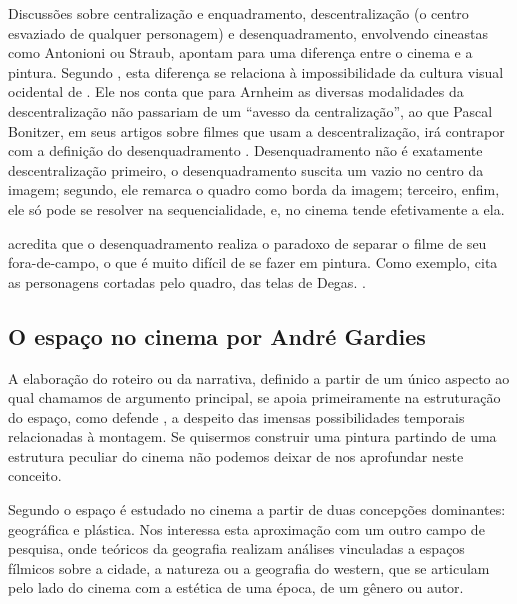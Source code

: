 Discussões sobre centralização e enquadramento, descentralização (o
centro esvaziado de qualquer personagem) e desenquadramento, envolvendo
cineastas como Antonioni ou Straub, apontam para uma diferença entre o
cinema e a pintura. Segundo \textcite{aumont2004olho}, esta diferença
se relaciona à impossibilidade da cultura visual ocidental de
. Ele nos conta que para Arnheim as
diversas modalidades da descentralização não passariam de um
\enquote{avesso da centralização}, ao que Pascal Bonitzer, em seus
artigos sobre filmes que usam a descentralização, irá contrapor com a
definição do desenquadramento \parencite[2019]{aumont2004olho}. Desenquadramento não é exatamente
descentralização \textelp{} primeiro, o desenquadramento suscita um
vazio no centro da imagem; segundo, ele remarca o quadro como borda da
imagem; terceiro, enfim, ele só pode se resolver na sequencialidade, e,
no cinema tende efetivamente a ela.
\parencite[Bonitzer \emph{in}][129]{aumont2004olho}

\citeauthor{aumont2004olho} acredita que o desenquadramento realiza o paradoxo de separar o filme de seu
fora-de-campo, o que é muito difícil de se fazer em pintura. Como
exemplo, cita as personagens cortadas pelo quadro, das telas de Degas.
.

\subsection{O espaço no cinema por André Gardies}%
\label{sec-espaco-cinema-gardies}

A elaboração do roteiro ou da narrativa, definido a partir de um único
aspecto ao qual chamamos de argumento principal, se apoia primeiramente
na estruturação do espaço, como defende \textcite{gardies2019espaco}, a
despeito das imensas possibilidades temporais relacionadas à montagem.
Se quisermos construir uma pintura partindo de uma estrutura peculiar
do cinema não podemos deixar de nos aprofundar neste conceito.

Segundo \textcite{gardies2019espaco} o espaço é estudado no cinema a
partir de duas concepções dominantes: geográfica e plástica. Nos
interessa esta aproximação com um outro campo de pesquisa, onde
teóricos da geografia realizam análises vinculadas a espaços fílmicos
sobre a cidade, a natureza ou a geografia do western, que se articulam
pelo lado do cinema com a estética de uma época, de um gênero ou autor.

